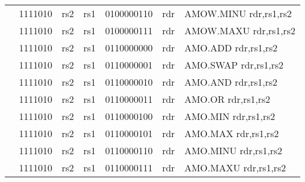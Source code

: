 \begin{table}[p]
\begin{small}
\begin{center}
\begin{tabular}{rcccccccccccl}
&
\multicolumn{2}{|c|}{1111010} &
\multicolumn{1}{c|}{rs2} &
\multicolumn{1}{c|}{rs1} &
\multicolumn{6}{c|}{0100000110} &
\multicolumn{1}{c|}{rdr} & AMOW.MINU rdr,rs1,rs2 \\
\cline{2-12}
  

&
\multicolumn{2}{|c|}{1111010} &
\multicolumn{1}{c|}{rs2} &
\multicolumn{1}{c|}{rs1} &
\multicolumn{6}{c|}{0100000111} &
\multicolumn{1}{c|}{rdr} & AMOW.MAXU rdr,rs1,rs2 \\
\cline{2-12}
  

&
\multicolumn{2}{|c|}{1111010} &
\multicolumn{1}{c|}{rs2} &
\multicolumn{1}{c|}{rs1} &
\multicolumn{6}{c|}{0110000000} &
\multicolumn{1}{c|}{rdr} & AMO.ADD rdr,rs1,rs2 \\
\cline{2-12}
  

&
\multicolumn{2}{|c|}{1111010} &
\multicolumn{1}{c|}{rs2} &
\multicolumn{1}{c|}{rs1} &
\multicolumn{6}{c|}{0110000001} &
\multicolumn{1}{c|}{rdr} & AMO.SWAP rdr,rs1,rs2 \\
\cline{2-12}
  

&
\multicolumn{2}{|c|}{1111010} &
\multicolumn{1}{c|}{rs2} &
\multicolumn{1}{c|}{rs1} &
\multicolumn{6}{c|}{0110000010} &
\multicolumn{1}{c|}{rdr} & AMO.AND rdr,rs1,rs2 \\
\cline{2-12}
  

&
\multicolumn{2}{|c|}{1111010} &
\multicolumn{1}{c|}{rs2} &
\multicolumn{1}{c|}{rs1} &
\multicolumn{6}{c|}{0110000011} &
\multicolumn{1}{c|}{rdr} & AMO.OR rdr,rs1,rs2 \\
\cline{2-12}
  

&
\multicolumn{2}{|c|}{1111010} &
\multicolumn{1}{c|}{rs2} &
\multicolumn{1}{c|}{rs1} &
\multicolumn{6}{c|}{0110000100} &
\multicolumn{1}{c|}{rdr} & AMO.MIN rdr,rs1,rs2 \\
\cline{2-12}
  

&
\multicolumn{2}{|c|}{1111010} &
\multicolumn{1}{c|}{rs2} &
\multicolumn{1}{c|}{rs1} &
\multicolumn{6}{c|}{0110000101} &
\multicolumn{1}{c|}{rdr} & AMO.MAX rdr,rs1,rs2 \\
\cline{2-12}
  

&
\multicolumn{2}{|c|}{1111010} &
\multicolumn{1}{c|}{rs2} &
\multicolumn{1}{c|}{rs1} &
\multicolumn{6}{c|}{0110000110} &
\multicolumn{1}{c|}{rdr} & AMO.MINU rdr,rs1,rs2 \\
\cline{2-12}
  

&
\multicolumn{2}{|c|}{1111010} &
\multicolumn{1}{c|}{rs2} &
\multicolumn{1}{c|}{rs1} &
\multicolumn{6}{c|}{0110000111} &
\multicolumn{1}{c|}{rdr} & AMO.MAXU rdr,rs1,rs2 \\
\cline{2-12}
  

\end{tabular}
\end{center}
\end{small}

\label{instr-table}
\end{table}
  

